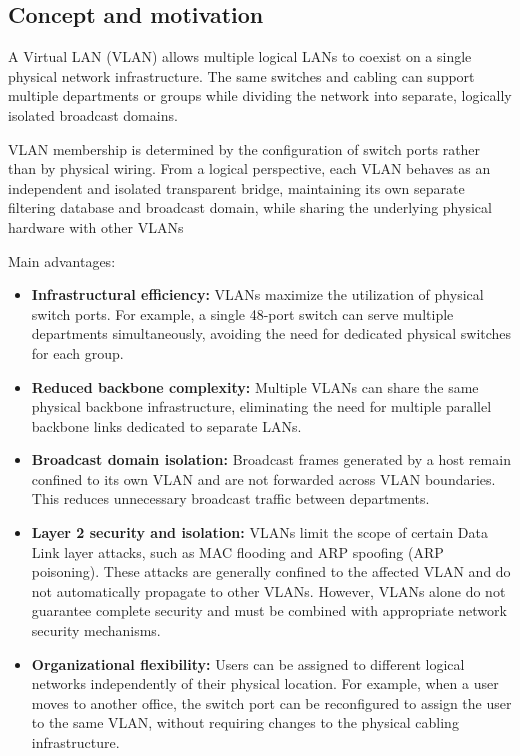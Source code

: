\subsection{Concept and motivation}

A Virtual LAN (VLAN) allows multiple logical LANs to coexist on a single physical network infrastructure. The same switches and cabling can support multiple departments or groups while dividing the network into separate, logically isolated broadcast domains.

\begin{center}
\end{center}

VLAN membership is determined by the configuration of switch ports rather than by physical wiring. From a logical perspective, each VLAN behaves as an independent and isolated transparent bridge, maintaining its own separate filtering database and broadcast domain, while sharing the underlying physical hardware with other VLANs

Main advantages:

\begin{itemize}
\item \textbf{Infrastructural efficiency:} VLANs maximize the utilization of physical switch ports. For example, a single 48-port switch can serve multiple departments simultaneously, avoiding the need for dedicated physical switches for each group.

\item \textbf{Reduced backbone complexity:} Multiple VLANs can share the same physical backbone infrastructure, eliminating the need for multiple parallel backbone links dedicated to separate LANs.

\item \textbf{Broadcast domain isolation:} Broadcast frames generated by a host remain confined to its own VLAN and are not forwarded across VLAN boundaries. This reduces unnecessary broadcast traffic between departments.

\item \textbf{Layer 2 security and isolation:} VLANs limit the scope of certain Data Link layer attacks, such as MAC flooding and ARP spoofing (ARP poisoning). These attacks are generally confined to the affected VLAN and do not automatically propagate to other VLANs. However, VLANs alone do not guarantee complete security and must be combined with appropriate network security mechanisms.

\item \textbf{Organizational flexibility:} Users can be assigned to different logical networks independently of their physical location. For example, when a user moves to another office, the switch port can be reconfigured to assign the user to the same VLAN, without requiring changes to the physical cabling infrastructure.

\end{itemize}

